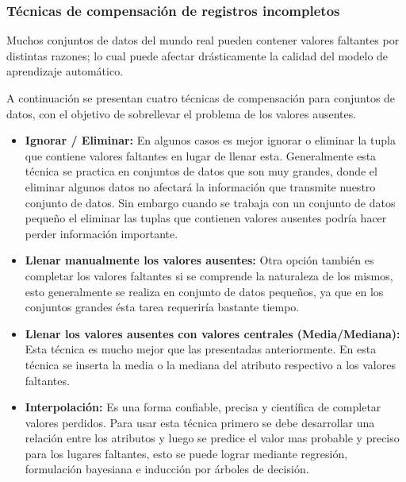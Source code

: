 \subsubsection{T\'{e}cnicas de compensaci\'{o}n de registros incompletos}

Muchos conjuntos de datos del mundo real pueden contener valores faltantes por distintas razones; lo cual puede afectar drásticamente la calidad del modelo de aprendizaje automático. 

A continuaci\'{o}n se presentan cuatro t\'{e}cnicas de compensaci\'{o}n para conjuntos de datos, con el objetivo de sobrellevar el problema de los valores ausentes.

\begin{itemize}
\item \textbf{Ignorar / Eliminar:} En algunos casos es mejor ignorar o eliminar la tupla que contiene valores faltantes en lugar de llenar esta. Generalmente esta t\'{e}cnica se practica en conjuntos de datos que son muy grandes, donde el eliminar algunos datos no afectar\'{a} la informaci\'{o}n que transmite nuestro conjunto de datos. Sin embargo cuando se trabaja con un conjunto de datos peque\~{n}o el eliminar las tuplas que contienen valores ausentes podr\'{i}a hacer perder informaci\'{o}n importante.

\item \textbf{Llenar manualmente los valores ausentes:} Otra opci\'{o}n tambi\'{e}n es completar los valores faltantes si se comprende la naturaleza de los mismos, esto generalmente se realiza en conjunto de datos peque\~{n}os, ya que en los conjuntos grandes \'{e}sta tarea requerir\'{i}a bastante tiempo.

\item \textbf{Llenar los valores ausentes con valores centrales (Media/Mediana):} Esta t\'{e}cnica es mucho mejor que las presentadas anteriormente. En esta t\'{e}cnica se inserta la media o la mediana del atributo respectivo a los valores faltantes. 

\item \textbf{Interpolaci\'{o}n:} Es una forma confiable, precisa y cient\'{i}fica de completar valores perdidos. Para usar esta t\'{e}cnica primero se debe desarrollar una relaci\'{o}n entre los atributos y luego se predice el valor mas probable y preciso para los lugares faltantes, esto se puede lograr mediante regresi\'{o}n, formulaci\'{o}n bayesiana e inducci\'{o}n por \'{a}rboles de decisi\'{o}n.

\end{itemize}

